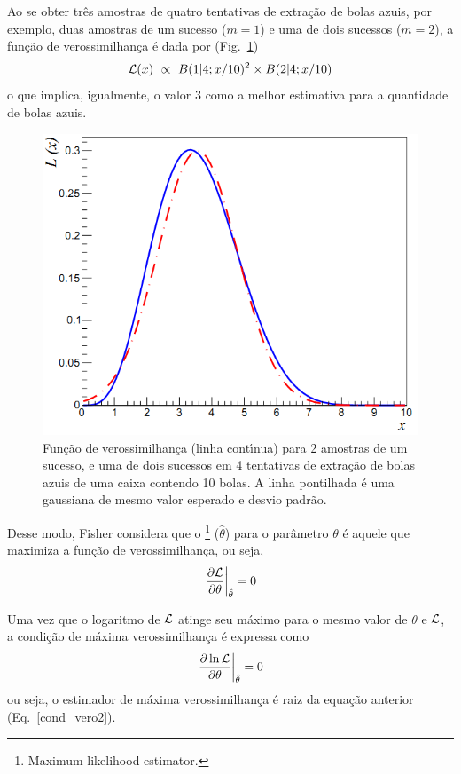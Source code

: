 %

Ao se obter tr\^{e}s amostras  de quatro tentativas de extra\c{c}\~{a}o de bolas azuis, por exemplo, duas amostras de um sucesso ($m=1$) e uma de dois sucessos ($m=2$), a  fun\c{c}\~{a}o de verossimilhan\c ca \'e dada por (Fig.~\ref{verossimil})
   $${\cal L} (x) \ \propto \ B (1|4; x/10)^2 \times  B (2|4; x/10)$$
o que implica, igualmente, o valor 3 como a melhor estimativa para a quantidade de bolas azuis.
\begin{figure}[hbtp]
\centerline{\includegraphics[width=7.cm]{veri_l2}}
\vspace{-0.2cm}
\caption{Fun\c{c}\~{a}o de verossimilhan\c{c}a (linha cont\'{\i}nua)  para 2 amostras de um sucesso, e uma de dois sucessos em 4 tentativas de extra\c{c}\~{a}o  de bolas azuis de uma caixa contendo 10 bolas. A linha  pontilhada \'{e} uma gaussiana de mesmo valor esperado e desvio padr\~{a}o.}
\label{verossimil}
\end{figure}



Desse modo,  Fisher considera que o \footnote{Maximum likelihood estimator.} ($\hat \theta$)  para o  par\^{a}metro $\theta$ \'{e} aquele que maximiza a  fun\c{c}\~{a}o de verossimilhan\c{c}a, ou seja,
\begin{equation}
 \label{cond_vero}
\left. \frac{\partial {\cal L}}{\partial \theta}\right|_{\hat \theta} = 0
 \end{equation}

Uma vez que o logaritmo de ${\cal L}$ atinge seu m\'{a}ximo para o mesmo valor de $\theta$ e ${\cal L}$, a condi\c{c}\~{a}o de m\'{a}xima verossimilhan\c{c}a \'{e} expressa como
\begin{equation}
 \label{cond_vero2}
\left.  \frac{\partial \ln {\cal L}}{\partial \theta}\right|_{\hat \theta} = 0
 \end{equation}
ou seja, o estimador de m\'{a}xima verossimilhan\c{c}a \'{e} raiz da equa\c{c}\~{a}o anterior (Eq.~\ref{cond_vero2}).



